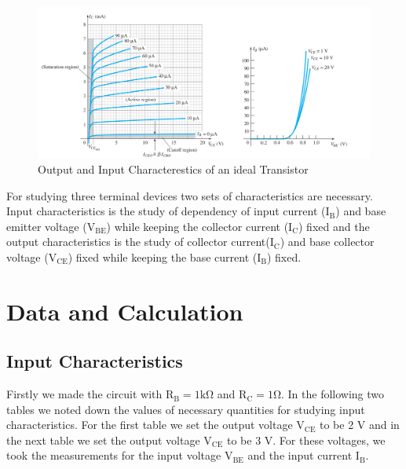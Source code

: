 \documentclass[12pt]{article}
\begin{document}
\begin{figure}[H]
    \centering
    \includegraphics[width = \textwidth]{IN_OUT.png}
    \caption{Output and Input Characterestics of an ideal Transistor}
    \label{fig:char}
\end{figure}
For studying three terminal devices two sets of characteristics are necessary. Input characteristics is the study of dependency of input current (\( \mathrm{I_B} \)) and base emitter voltage (\( \mathrm{V_{BE}} \)) while keeping the collector current (\( \mathrm{I_C}\)) fixed and the output characteristics is the study of collector current(\( \mathrm{I_C }\)) and base collector voltage (\( \mathrm{V_{CE}} \)) fixed while keeping the base current (\( \mathrm{I_B } \)) fixed.



\section{Data and Calculation}

\subsection{Input Characteristics}

Firstly we made the circuit with \(\mathrm{R_B = 1 k\Omega}\) and \( \mathrm{R_C = 1 \Omega }\). In the following two tables we noted down the values of necessary quantities for studying input characteristics. For the first table we set the output voltage $\mathrm{V_{CE}}$ to be  2 V and in the next table we set the output voltage $\mathrm{V_{CE}}$ to be 3 V.  For these voltages, we took the measurements for the input voltage $\mathrm{V_{BE}}$ and the input current $\mathrm{I_B}$.
\end{document}
